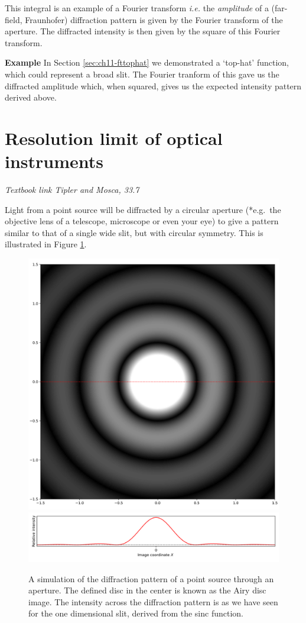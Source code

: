 \documentclass[
]{book}
\begin{document}
This integral is an example of a Fourier transform \emph{i.e.} the \emph{amplitude} of a (far-field, Fraunhofer) diffraction pattern is given by the Fourier transform of the aperture. The diffracted intensity is then given by the square of this Fourier transform.

\textbf{Example} In Section \ref{sec:ch11-fttophat} we demonstrated a `top-hat' function, which could represent a broad slit. The Fourier tranform of this gave us the diffracted amplitude which, when squared, gives us the expected intensity pattern derived above.

\hypertarget{sec:ch13-resolutionlimit}{%
\section{Resolution limit of optical instruments}\label{sec:ch13-resolutionlimit}}

\emph{Textbook link Tipler and Mosca, 33.7}

Light from a point source will be diffracted by a circular aperture (*e.g.~the objective lens of a telescope, microscope or even your eye) to give a pattern similar to that of a single wide slit, but with circular symmetry. This is illustrated in Figure \ref{fig:ch13-circulardiffraction1}.

\begin{figure}

{\centering \includegraphics[width=0.7\linewidth]{visualisations/ch13-singlesource-diffraction} \includegraphics[width=0.7\linewidth]{visualisations/ch13-singlesource-diffraction-b} 

}

\caption{A simulation of the diffraction pattern of a point source through an aperture. The defined disc in the center is known as the Airy disc image. The intensity across the diffraction pattern is as we have seen for the one dimensional slit, derived from the sinc function.}\label{fig:ch13-circulardiffraction1}
\end{figure}
\end{document}
